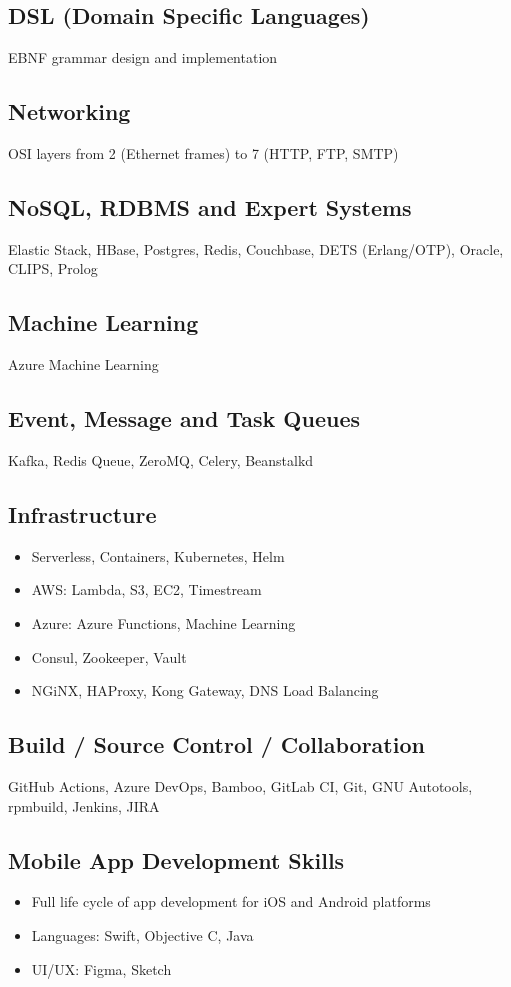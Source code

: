 \subsection*{DSL (Domain Specific Languages)}
EBNF grammar design and implementation

\subsection*{Networking}
OSI layers from 2 (Ethernet frames) to 7 (HTTP, FTP, SMTP)

\subsection*{NoSQL, RDBMS and Expert Systems}
Elastic Stack, HBase, Postgres, Redis, Couchbase, DETS (Erlang/OTP), Oracle, CLIPS, Prolog

\subsection*{Machine Learning}
Azure Machine Learning

\subsection*{Event, Message and Task Queues}
Kafka, Redis Queue, ZeroMQ, Celery, Beanstalkd

\subsection*{Infrastructure}
\begin{itemize}[noitemsep, nosep]
  \item Serverless, Containers, Kubernetes, Helm
  \item AWS: Lambda, S3, EC2, Timestream
  \item Azure: Azure Functions, Machine Learning
  \item Consul, Zookeeper, Vault
  \item NGiNX, HAProxy, Kong Gateway, DNS Load Balancing
\end{itemize}

\subsection*{Build / Source Control / Collaboration}
GitHub Actions, Azure DevOps, Bamboo, GitLab CI, Git, GNU Autotools, rpmbuild, Jenkins, JIRA

\subsection*{Mobile App Development Skills}
\begin{itemize}[noitemsep, nosep]
  \item Full life cycle of app development for iOS and Android platforms
  \item Languages: Swift, Objective C, Java
  \item UI/UX: Figma, Sketch
\end{itemize}

